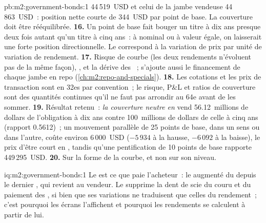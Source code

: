 \begin{solution}{pb:m2:government-bonds:1}
44\,519~USD et celui de la jambe vendeuse 44\,863~USD~: position nette courte de 344~USD par point de base.
La couverture doit être rééquilibrée.
\textbf{16.} Un point de base fait bouger un titre à dix ans presque deux fois autant
qu'un titre à cinq ans~: à nominal ou à valeur égale, on laisserait une forte position
directionnelle. Le  correspond à la variation de prix par unité de variation de rendement.
\textbf{17.} Risque de courbe (les deux rendements n'évoluent pas de la même façon), , et la
dérive des ~; s'ajoute aussi le financement de chaque jambe en repo (\cref{ch:m2:repo-and-specials}).
\textbf{18.} Les cotations et les prix de transaction sont en 32es par convention~; le risque,
P\&L et ratios de couverture sont des quantités continues qu'il ne faut pas arrondir au
64e avant de les sommer.
\textbf{19.} Résultat retenu~: \emph{la couverture neutre en } vend 56.12~millions de dollars
de l'obligation à dix ans contre 100~millions de dollars de celle à cinq ans (rapport 0.5612)~;
un mouvement parallèle de 25 points de base, dans un sens ou dans l'autre, coûte environ 6\,000~USD
($-5\,934$ à la hausse, $-6\,092$ à la baisse), le prix d'être court en , tandis
qu'une pentification de 10 points de base rapporte 449\,295~USD.
\textbf{20.} Sur la forme de la courbe, et non sur son niveau.
\end{solution}

\begin{solution}{iq:m2:government-bonds:1}
Le  est ce que paie l'acheteur~: le  augmenté du
 depuis le dernier , qui revient au vendeur. Le 
supprime la dent de scie du couru et du paiement des , si bien que ses
variations ne traduisent que celles du rendement~; c'est pourquoi les écrans l'affichent et
pourquoi les rendements se calculent à partir de lui.
\end{solution}

